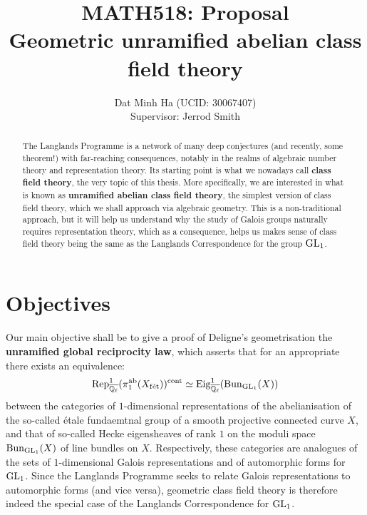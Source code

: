 
\usepackage{soul}





	\title{\textbf{MATH518: Proposal
	\\
	Geometric unramified abelian class field theory}}
	
	\author{Dat Minh Ha (UCID: 30067407)\\Supervisor: Jerrod Smith}
	\maketitle
	
	\begin{abstract}
	    The Langlands Programme is a network of many deep conjectures (and recently, some theorem!) with far-reaching consequences, notably in the realms of algebraic number theory and representation theory. Its starting point is what we nowadays call \textbf{class field theory}, the very topic of this thesis. More specifically, we are interested in what is known as \textbf{unramified abelian class field theory}, the simplest version of class field theory, which we shall approach via algebraic geometry. This is a non-traditional approach, but it will help us understand why the study of Galois groups naturally requires representation theory, which as a consequence, helps us makes sense of class field theory being the same as the Langlands Correspondence for the group $\operatorname{GL}_1$.
	\end{abstract}
	    
	\section{Objectives}
	    Our main objective shall be to give a proof of Deligne's geometrisation the \textbf{unramified global reciprocity law}, which asserts that for an appropriate there exists an equivalence:
	        $$\mathrm{Rep}_{\overline{\mathbb{Q}_{\ell}}}^1(\pi_1^{\mathrm{ab}}(X_{\mathrm{f\acute{e}t}}))^{\mathrm{cont}} \simeq \mathrm{Eig}^1_{\overline{\mathbb{Q}_{\ell}}}(\mathrm{Bun}_{\operatorname{GL}_1}(X))$$
	    between the categories of $1$-dimensional representations of the abelianisation of the so-called \'etale fundaemtnal group of a smooth projective connected curve $X$, and that of so-called Hecke eigensheaves of rank $1$ on the moduli space $\mathrm{Bun}_{\operatorname{GL}_1}(X)$ of line bundles on $X$. Respectively, these categories are analogues of the sets of $1$-dimensional Galois representations and of automorphic forms for $\operatorname{GL}_1$. Since the Langlands Programme seeks to relate Galois representations to automorphic forms (and vice versa), geometric class field theory is therefore indeed the special case of the Langlands Correspondence for $\operatorname{GL}_1$.
	

